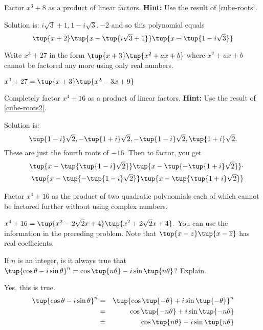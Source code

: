 \begin{enumialphparenastyle}
\begin{ex} Factor $x^{3}+8$ as a product of linear factors. \textbf{Hint:} Use the result of \ref{cube-roots}.
\begin{sol}
Solution
is: $i\sqrt{3}+1,1-i\sqrt{3},-2$ and so this polynomial equals
\[
\tup{x+2} \tup{x-\tup{i\sqrt{3}+1} } \tup{x-\tup{
1-i\sqrt{3}} }
\]
\end{sol}
\end{ex}

\begin{ex} Write $x^{3}+27$ in the form $\tup{x+3} \tup{
x^{2}+ax+b} $ where $x^{2}+ax+b$ cannot be factored any more using
only real numbers. 
\begin{sol}
$x^{3}+27= \tup{x+3} \tup{
x^{2}-3x+9} $
\end{sol}
\end{ex}

\begin{ex} Completely factor $x^{4}+16$ as a product of linear factors. \textbf{Hint:} Use the result of \ref{cube-roots2}. 
\begin{sol}
Solution is:
\[
\tup{1-i} \sqrt{2},-\tup{1+i} \sqrt{2},-\tup{1-i}
\sqrt{2},\tup{1+i} \sqrt{2}.
\]
These are just the fourth roots of $-16$. Then to factor, you get
\begin{eqnarray*}
&&\tup{x-\tup{\tup{1-i} \sqrt{2}} } \tup{x-\tup{
-\tup{1+i} \sqrt{2}} } \cdot \\
&&\tup{x-\tup{-\tup{1-i} \sqrt{2}} } \tup{x-\tup{
\tup{1+i} \allowbreak \sqrt{2}} }
\end{eqnarray*}
\end{sol}
\end{ex}


\begin{ex} Factor $x^{4}+16$ as the product of two quadratic polynomials each of
which cannot be factored further without using complex numbers. 
\begin{sol}
$x^{4}+16=\tup{x^{2}-2\sqrt{2}x+4} \tup{x^{2}+2\sqrt{2}x+4} .
$ You can use the information in the preceding problem. Note that $\tup{
x-z} \tup{x-\overline{z}} $ has real coefficients.
\end{sol}
\end{ex}

\begin{ex} If $n$ is an integer, is it always true that $\tup{\cos \theta
-i\sin \theta } ^{n}=\cos \tup{n\theta } -i\sin \tup{n\theta
} $? Explain.
\begin{sol}
Yes, this is true.
\begin{eqnarray*}
\tup{\cos \theta -i\sin \theta } ^{n} &=&\tup{\cos \tup{-\theta
} +i\sin \tup{-\theta } } ^{n} \\
&=&\cos \tup{-n\theta } +i\sin \tup{-n\theta } \\
&=&\cos \tup{n\theta } -i\sin \tup{n\theta }
\end{eqnarray*}
\end{sol}
\end{ex}



\end{enumialphparenastyle}
